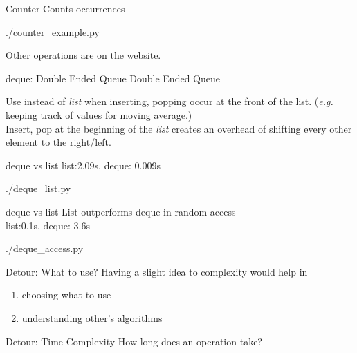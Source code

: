 \documentclass{beamer}
\begin{document}
\begin{frame}{Counter}
  Counts occurrences
  \begin{lstinputlisting}
    {./counter_example.py}
  \end{lstinputlisting}
  Other operations are on the website.
\end{frame}

\begin{frame}{deque: Double Ended Queue}
  Double Ended Queue\\
  \medskip

  Use instead of \textit{list} when inserting, popping occur at the front
  of the list. (\textit{e.g.} keeping track of values for moving average.)\\
  Insert, pop at the beginning of the \textit{list} creates an overhead of
  shifting every other element to the right/left.\\
\end{frame}

\begin{frame}{deque vs list}
  list:2.09s, deque: 0.009s
  \begin{lstinputlisting}
    {./deque_list.py}
  \end{lstinputlisting}
\end{frame}

\begin{frame}{deque vs list}
  List outperforms deque in random access\\
  list:0.1s, deque: 3.6s
  \begin{lstinputlisting}
    {./deque_access.py}
  \end{lstinputlisting}
\end{frame}

\begin{frame}{Detour: What to use?}
  Having a slight idea to complexity would help in
  \begin{enumerate}
    \item choosing what to use
    \item understanding other's algorithms
  \end{enumerate}
\end{frame}

\begin{frame}{Detour: Time Complexity}
  How long does an operation take?\\
\end{frame}
\end{document}
